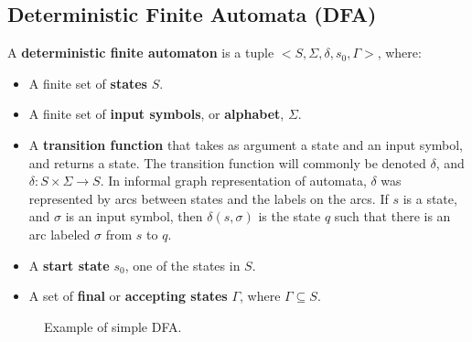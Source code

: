 \subsection{Deterministic Finite Automata (DFA)}
\begin{definition}
\label{def:detsm}
A \textbf{deterministic finite automaton} is a tuple $<S, \Sigma, \delta, s_0, \Gamma>$, where:
\begin{itemize}
\item A finite set of \textbf{states} $S$.
\item A finite set of \textbf{input symbols}, or \textbf{alphabet}, $\Sigma$.
\item A \textbf{transition function} that takes as argument a state and an input symbol, and returns a state. The transition function will commonly be denoted $\delta$, and $\delta: S \times \Sigma \rightarrow S$. In informal graph representation of automata, $\delta$ was represented by arcs between states and the labels on the arcs. If $s$ is a state, and $\sigma$ is an input symbol, then $\delta(s,\sigma)$ is the state $q$ such that there is an arc labeled $\sigma$ from $s$ to $q$.
\item A \textbf{start state} $s_0$, one of the states in $S$.
\item A set of \textbf{final} or \textbf{accepting states} $\Gamma$, where $\Gamma \subseteq S$.
\end{itemize}
\end{definition}

\begin{figure}[H]
\centering
{}
\caption{Example of simple DFA.}\label{fig:DFA}
\end{figure}


